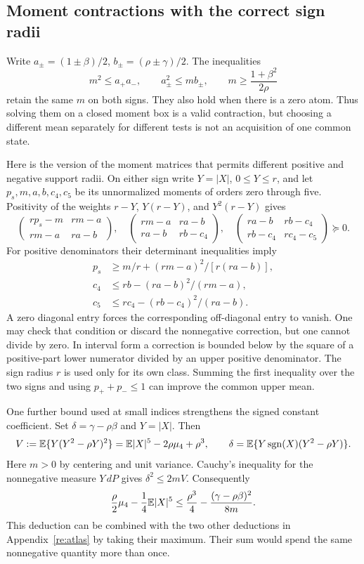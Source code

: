 \subsection{Moment contractions with the correct sign radii}
Write $a_\pm=(1\pm\beta)/2$, $b_\pm=(\rho\pm\gamma)/2$.
The inequalities
\[
 m^2\le a_+a_-,\qquad a_\pm^2\le m b_\pm,\qquad
 m\ge\frac{1+\beta^2}{2\rho}
\]
retain the same $m$ on both signs. They also hold when there is a zero
atom. Thus solving them on a closed moment box is a valid contraction,
but choosing a different mean separately for different tests is not an
acquisition of one common state.

Here is the version of the moment matrices that permits different
positive and negative support radii. On either sign write $Y=|X|$,
$0\le Y\le r$, and let $p_s,m,a,b,c_4,c_5$ be its unnormalized
moments of orders zero through five. Positivity of the weights
$r-Y$, $Y(r-Y)$, and $Y^2(r-Y)$ gives
\[
 \begin{pmatrix}rp_s-m&rm-a\\rm-a&ra-b\end{pmatrix},\quad
 \begin{pmatrix}rm-a&ra-b\\ra-b&rb-c_4\end{pmatrix},\quad
 \begin{pmatrix}ra-b&rb-c_4\\rb-c_4&rc_4-c_5\end{pmatrix}
 \succeq0.
\]
For positive denominators their determinant inequalities imply
\begin{align*}
 p_s&\ge m/r+(rm-a)^2/[r(ra-b)],\\
 c_4&\le rb-(ra-b)^2/(rm-a),\\
 c_5&\le rc_4-(rb-c_4)^2/(ra-b).
\end{align*}
A zero diagonal entry forces the corresponding off-diagonal entry to
vanish. One may check that condition or discard the nonnegative
correction, but one cannot divide by zero. In interval form a correction
is bounded below by the square of a positive-part lower numerator
divided by an upper positive denominator. The sign radius $r$ is used
only for its own class. Summing the first inequality over the two signs
and using $p_++p_-\le1$ can improve the common upper mean.

One further bound used at small indices strengthens the signed constant
coefficient. Set $\delta=\gamma-\rho\beta$ and $Y=|X|$. Then
\[
 V:=\mathbb E\{Y(Y^2-\rho Y)^2\}
   =\mathbb E|X|^5-2\rho\mu_4+\rho^3,
 \qquad
 \delta=\mathbb E\{Y\operatorname{sgn}(X)(Y^2-\rho Y)\}.
\]
Here $m>0$ by centering and unit variance.
Cauchy's inequality for the nonnegative measure $Y\,dP$ gives
$\delta^2\le2mV$. Consequently
\begin{equation}\label{ext:weighted-cubic-loss}
 \frac\rho2\mu_4-\frac14\mathbb E|X|^5
 \le\frac{\rho^3}{4}-\frac{(\gamma-\rho\beta)^2}{8m}.
\end{equation}
This deduction can be combined with the two other deductions in
Appendix~\ref{re:atlas} by taking their maximum. Their sum would spend
the same nonnegative quantity more than once.

